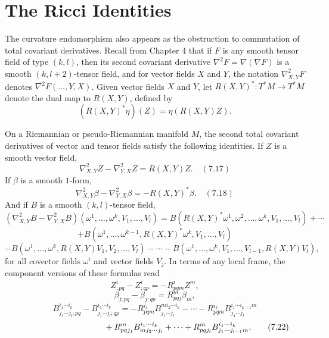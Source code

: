 \section{The Ricci Identities}

The curvature endomorphism also appears as the obstruction to commutation of total covariant derivatives. Recall from Chapter 4 that if $F$ is any smooth tensor field of type $(k, l)$, then its second covariant derivative $\nabla^2 F = \nabla(\nabla F)$ is a smooth $(k, l+2)$-tensor field, and for vector fields $X$ and $Y$, the notation $\nabla^2_{X,Y} F$ denotes $\nabla^2 F(\ldots, Y, X)$. Given vector fields $X$ and $Y$, let $R(X,Y)^* : T^* M \to T^* M$ denote the dual map to $R(X,Y)$, defined by
$$(R(X,Y)^* \eta)(Z) = \eta(R(X,Y)Z).$$

\begin{theorem}
\label{thm:ricci-identities}
On a Riemannian or pseudo-Riemannian manifold $M$, the second total covariant derivatives of vector and tensor fields satisfy the following identities. If $Z$ is a smooth vector field,
$$\nabla^2_{X,Y} Z - \nabla^2_{Y,X} Z = R(X,Y)Z. \quad (7.17)$$
If $\beta$ is a smooth $1$-form,
$$\nabla^2_{X,Y} \beta - \nabla^2_{Y,X} \beta = -R(X,Y)^* \beta. \quad (7.18)$$
And if $B$ is a smooth $(k, l)$-tensor field,
\[
(\nabla^2_{X,Y} B - \nabla^2_{Y,X} B)(\omega^1,\ldots,\omega^k, V_1,\ldots, V_l)
= B(R(X,Y)^* \omega^1, \omega^2,\ldots,\omega^k, V_1,\ldots,V_l) + \cdots
\]
\begin{equation}
+ B(\omega^1,\ldots,\omega^{k-1}, R(X,Y)^* \omega^k, V_1,\ldots, V_l) \tag{7.19}
\end{equation}
\[
- B(\omega^1,\ldots,\omega^k, R(X,Y)V_1, V_2,\ldots, V_l) - \cdots
- B(\omega^1,\ldots,\omega^k, V_1,\ldots, V_{l-1}, R(X,Y)V_l),
\]
for all covector fields $\omega^i$ and vector fields $V_j$. In terms of any local frame, the component versions of these formulas read
\begin{equation}
Z^i_{;pq} - Z^i_{;qp} = -R_{pqm}^i Z^m, \tag{7.20}
\end{equation}
\begin{equation}
\beta_{j;pq} - \beta_{j;qp} = R_{pqj}^m \beta_m, \tag{7.21}
\end{equation}
\[
B^{i_1\cdots i_k}_{j_1\cdots j_l;pq} - B^{i_1\cdots i_k}_{j_1\cdots j_l;qp} = -R_{pqm}^{i_1} B^{m i_2 \cdots i_k}_{j_1\cdots j_l} - \cdots - R_{pqm}^{i_k} B^{i_1\cdots i_{k-1}m}_{j_1\cdots j_l}
\]
\begin{equation}
\hphantom{B^{i_1\cdots i_k}_{j_1\cdots j_l;pq} - B^{i_1\cdots i_k}_{j_1\cdots j_l;qp} =} + R_{pqj_1}^m B^{i_1\cdots i_k}_{m j_2\cdots j_l} + \cdots + R_{pqj_l}^m B^{i_1\cdots i_k}_{j_1\cdots j_{l-1}m}. \tag{7.22}
\end{equation}
\end{theorem}

